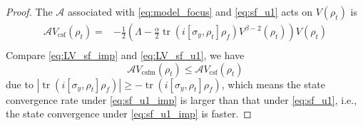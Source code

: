 \documentclass[]{elsarticle}
\begin{document}
\begin{proof}
	The $\mathcal{A}$ associated with \eqref{eq:model_focus} and \eqref{eq:sf_u1} acts on $V(\rho_{t})$ is
	\begin{equation}\label{eq:LV_sf_u1}
		\begin{aligned}
			\mathcal{A} V_{\mathrm{csf}}\left(\rho_{t}\right)=&-\frac{1}{2}\left(\Lambda-\frac{\alpha}{2}\operatorname{tr}\left(i\left[\sigma_{y}, \rho_{t}\right] {\rho_f}\right) V^{\beta-2}\left(\rho_{t}\right)\right)V\left(\rho_{t}\right)\\
		\end{aligned}
	\end{equation}
	Compare \eqref{eq:LV_sf_imp} and \eqref{eq:LV_sf_u1}, we have
	\begin{equation}
		\mathcal{A} V_{\mathrm{csfm}}\left(\rho_{t}\right)\le\mathcal{A} V_{\mathrm{csf}}\left(\rho_{t}\right)
	\end{equation}
	due to $|\operatorname{tr}\left(i\left[\sigma_{y}, \rho_{t}\right] {\rho_f}\right)|\ge-\operatorname{tr}\left(i\left[\sigma_{y}, \rho_{t}\right] {\rho_f}\right)$, which means the state convergence rate under \eqref{eq:sf_u1_imp} is larger than that under \eqref{eq:sf_u1}, i.e., the state convergence under \eqref{eq:sf_u1_imp} is faster.
	

\end{proof}
\end{document}
